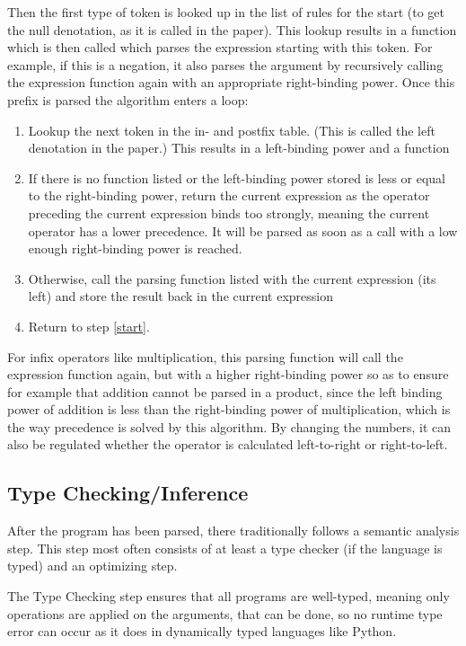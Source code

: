 \documentclass[12pt]{article}
\begin{document}
Then the first type of token is looked up
in the list of rules for the start
(to get the null denotation, as it is called in the paper).
This lookup results in a function which is then called
which parses the expression starting with this token.
For example, if this is a negation, it also parses the argument
by recursively calling the expression function again with an
appropriate right-binding power.
Once this prefix is parsed the algorithm enters a loop:
\begin{enumerate}
	\item \label{start}
	      Lookup the next token in the in- and postfix table.
	      (This is called the left denotation in the paper.)
	      This results in a left-binding power and a function
	\item If there is no function listed or
	      the left-binding power stored is less or equal
	      to the right-binding power, return the current expression
	      as the operator preceding the current expression binds
	      too strongly, meaning the current operator has a lower precedence.
	      It will be parsed as soon as a call with a low enough
	      right-binding power is reached.
	\item Otherwise, call the parsing function listed with the current expression
	      (its left) and store the result back in the current expression
	\item Return to step \ref{start}.
\end{enumerate}
For infix operators like multiplication, this parsing function
will call the expression function again, but with a higher right-binding power
so as to ensure for example that addition cannot be parsed in a product,
since the left binding power of addition is less than
the right-binding power of multiplication,
which is the way precedence is solved by this algorithm.
By changing the numbers, it can also be regulated whether the operator
is calculated left-to-right or right-to-left.

\subsection{Type Checking/Inference}
After the program has been parsed, there traditionally follows
a semantic analysis step. This step most often consists of at least a type checker
(if the language is typed) and an optimizing step.

The Type Checking step ensures that all programs are well-typed,
meaning only operations are applied on the arguments, that can
be done, so no runtime type error can occur as it does in dynamically typed
languages like Python.
\end{document}
